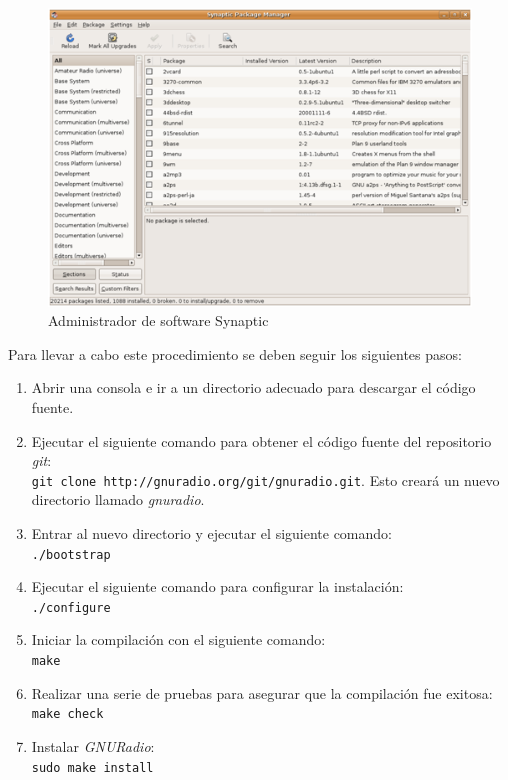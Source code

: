 \begin{figure}
\centering
	\includegraphics[scale=0.7]{figs/synaptic}
	\vspace{0.1in}
	\caption{Administrador de software Synaptic}
	\label{fig:synaptic}
\end{figure}

Para llevar a cabo este procedimiento se deben seguir los siguientes pasos:

\begin{enumerate}
  \item Abrir una consola e ir a un directorio adecuado para descargar el
  c\'odigo fuente.
  \item Ejecutar el siguiente comando para obtener el c\'odigo fuente del repositorio \emph{git}:\\
  \verb|git clone http://gnuradio.org/git/gnuradio.git|. Esto crear\'a un nuevo
  directorio llamado \emph{gnuradio}.
  \item Entrar al nuevo directorio y ejecutar el siguiente comando:\\
  \verb|./bootstrap|
  \item Ejecutar el siguiente comando para configurar la instalaci\'on:\\
  \verb|./configure|
  \item Iniciar la compilaci\'on con el siguiente comando: \\
  \verb|make|
  \item Realizar una serie de pruebas para asegurar que la compilaci\'on fue
  exitosa:\\
  \verb|make check|
  \item Instalar \emph{GNURadio}: \\
  \verb|sudo make install|
\end{enumerate}

